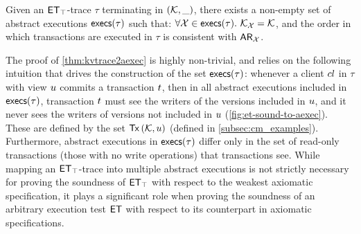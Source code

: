 \begin{theorem}
\label{thm:kvtrace2aexec}
Given an \(\mathsf{ET}_{\top}\)-trace \(\tau\) terminating in \((\mathcal{K}, \_)\), 
there exists a non-empty set of abstract executions \(\execs(\tau)\)
such that: \(\forall \aexec \in \execs(\tau).\ \hh_{\aexec} = \hh\), 
and the order in which transactions are executed in \(\tau\) is consistent with \(\mathsf{AR}_{\mathcal{X}}\). 
\end{theorem}
\noindent 
The proof of \cref{thm:kvtrace2aexec} is highly
non-trivial, and relies on the following intuition that drives the construction of the set \(\execs(\tau)\): 
whenever a client \({cl}\) in \(\tau\)  with view \(u\) commits a transaction \(t\), then in all 
abstract executions included in \(\execs(\tau)\), transaction \(t\) must see the writers  
of the versions included in \(u\), and it never sees the writers of versions not included in \(u\) (\cref{fig:et-sound-to-aexec}). 
These are defined by the set \(\Tx[\hh, \vi]\) (defined in \cref{subsec:cm_examples}). Furthermore, 
abstract executions in \(\execs(\tau)\) differ only in the set of read-only transactions (\ie those with no write operations) 
that transactions see. While mapping an \(\mathsf{ET}_{\top}\)-trace into multiple abstract executions is 
not strictly necessary for proving the soundness of \(\mathsf{ET}_{\top}\) with respect 
to the weakest axiomatic specification, it plays a significant role when proving the soundness 
of an arbitrary execution test \(\mathsf{ET}\) with respect to its counterpart in axiomatic specifications. 

